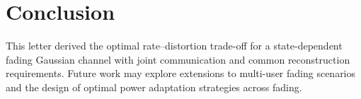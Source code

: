 \documentclass[journal]{IEEEtran}
\begin{document}
\section{Conclusion}\label{sec:concl}
This letter derived the optimal rate–distortion trade-off for a state-dependent fading Gaussian channel with joint communication and common reconstruction requirements. Future work may explore extensions to multi-user fading scenarios and the design of optimal power adaptation strategies across fading.




\nocite{ramachandran2018communication}
\nocite{ramachandran2022joint}
\end{document}
